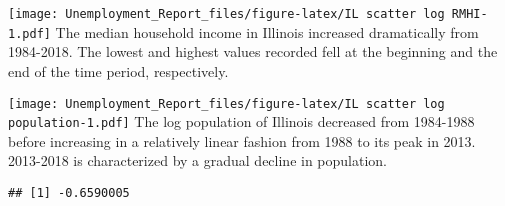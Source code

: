 \documentclass[
]{article}
\newenvironment{Shaded}{\begin{snugshade}}{\end{snugshade}}
\newcommand{\CommentTok}[1]{\textcolor[rgb]{0.56,0.35,0.01}{\textit{#1}}}
\newcommand{\DataTypeTok}[1]{\textcolor[rgb]{0.13,0.29,0.53}{#1}}
\newcommand{\DecValTok}[1]{\textcolor[rgb]{0.00,0.00,0.81}{#1}}
\newcommand{\KeywordTok}[1]{\textcolor[rgb]{0.13,0.29,0.53}{\textbf{#1}}}
\newcommand{\NormalTok}[1]{#1}
\newcommand{\OperatorTok}[1]{\textcolor[rgb]{0.81,0.36,0.00}{\textbf{#1}}}
\newcommand{\StringTok}[1]{\textcolor[rgb]{0.31,0.60,0.02}{#1}}
\begin{document}
\begin{Shaded}
\end{Shaded}

\texttt{[image: Unemployment\_Report\_files/figure-latex/IL scatter log RMHI-1.pdf]}
The median household income in Illinois increased dramatically from
1984-2018. The lowest and highest values recorded fell at the beginning
and the end of the time period, respectively.

\begin{Shaded}
\end{Shaded}

\texttt{[image: Unemployment\_Report\_files/figure-latex/IL scatter log population-1.pdf]}
The log population of Illinois decreased from 1984-1988 before
increasing in a relatively linear fashion from 1988 to its peak in 2013.
2013-2018 is characterized by a gradual decline in population.

\begin{Shaded}
\end{Shaded}

\begin{verbatim}
## [1] -0.6590005
\end{verbatim}
\end{document}
